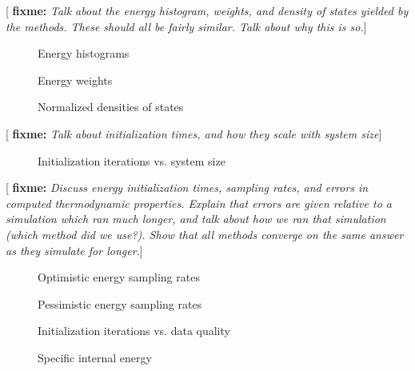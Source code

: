 \documentclass[11pt]{article}
\newcommand{\red}[1]{{\bf \color{red} #1}}
\newcommand{\fixme}[1]{[\red{fixme:} \emph{#1}]}
\begin{document}
\fixme{Talk about the energy histogram, weights, and density of states
  yielded by the methods. These should all be fairly similar. Talk
  about why this is so.}

\begin{figure}[H]
  \centering
  \caption[Energy histograms]{Energy histograms}
  \label{fig:histograms}
\end{figure}

\begin{figure}[H]
  \centering
  \caption[Energy weights]{Energy weights}
  \label{fig:weights}
\end{figure}

\begin{figure}[H]
  \centering
  \caption[Normalized densities of states]{Normalized densities of
    states}
  \label{fig:density_of_states}
\end{figure}

\fixme{Talk about initialization times, and how they scale with system
  size}

\begin{figure}[H]
  \centering
  \caption[Initialization iterations vs. system size]{Initialization
    iterations vs. system size}
  \label{fig:scaling}
\end{figure}

\fixme{Discuss energy initialization times, sampling rates, and errors
  in computed thermodynamic properties. Explain that errors are given
  relative to a simulation which ran much longer, and talk about how
  we ran that simulation (which method did we use?). Show that all
  methods converge on the same answer as they simulate for longer.}

\begin{figure}[H]
  \centering
  \caption[Optimistic energy sampling rates]{Optimistic energy
    sampling rates}
  \label{fig:opt_sample_rate}
\end{figure}

\begin{figure}[H]
  \centering
  \caption[Pessimistic energy sampling rates]{Pessimistic energy
    sampling rates}
  \label{fig:pes_sample_rate}
\end{figure}

\begin{figure}[H]
  \centering
  \caption[Initialization iterations vs. data quality]{Initialization
    iterations vs. data quality}
  \label{fig:quality}
\end{figure}

\begin{figure}[H]
  \centering
  \caption[Specific internal energy]{Specific internal energy}
  \label{fig:internal_energy}
\end{figure}
\end{document}
